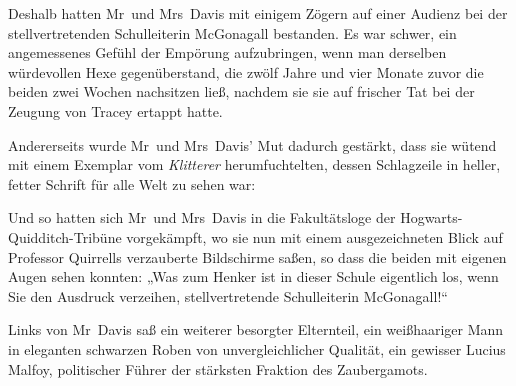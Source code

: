 Deshalb hatten Mr~und Mrs~Davis mit einigem Zögern auf einer Audienz bei der stellvertretenden Schulleiterin McGonagall bestanden. Es war schwer, ein angemessenes Gefühl der Empörung aufzubringen, wenn man derselben würdevollen Hexe gegenüberstand, die zwölf Jahre und vier Monate zuvor die beiden zwei Wochen nachsitzen ließ, nachdem sie sie auf frischer Tat bei der Zeugung von Tracey ertappt hatte.

Andererseits wurde Mr~und Mrs~Davis' Mut dadurch gestärkt, dass sie wütend mit einem Exemplar vom \emph{Klitterer} herumfuchtelten, dessen Schlagzeile in heller, fetter Schrift für alle Welt zu sehen war:


Und so hatten sich Mr~und Mrs~Davis in die Fakultätsloge der Hogwarts-Quidditch-Tribüne vorgekämpft, wo sie nun mit einem ausgezeichneten Blick auf Professor Quirrells verzauberte Bildschirme saßen, so dass die beiden mit eigenen Augen sehen konnten: „Was zum Henker ist in dieser Schule eigentlich los, wenn Sie den Ausdruck verzeihen, stellvertretende Schulleiterin McGonagall!“

Links von Mr~Davis saß ein weiterer besorgter Elternteil, ein weißhaariger Mann in eleganten schwarzen Roben von unvergleichlicher Qualität, ein gewisser Lucius Malfoy, politischer Führer der stärksten Fraktion des Zaubergamots.

